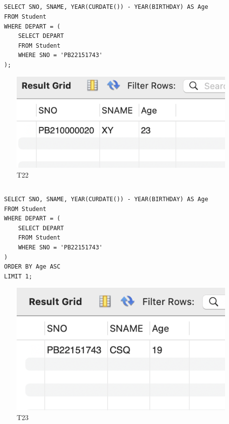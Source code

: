 \documentclass[UTF8]{ctexart}
\begin{document}
\subsection{}
\begin{lstlisting}
  SELECT SNO, SNAME, YEAR(CURDATE()) - YEAR(BIRTHDAY) AS Age
  FROM Student
  WHERE DEPART = (
      SELECT DEPART
      FROM Student
      WHERE SNO = 'PB22151743'
  );
\end{lstlisting}
\begin{figure}[H]
  \centering
  \includegraphics[scale=0.7]{pics/22.png}
  \caption*{T22}
\end{figure}

\subsection{}
\begin{lstlisting}
  SELECT SNO, SNAME, YEAR(CURDATE()) - YEAR(BIRTHDAY) AS Age
  FROM Student
  WHERE DEPART = (
      SELECT DEPART
      FROM Student
      WHERE SNO = 'PB22151743'
  )
  ORDER BY Age ASC
  LIMIT 1;
\end{lstlisting}
\begin{figure}[H]
  \centering
  \includegraphics[scale=0.7]{pics/23.png}
  \caption*{T23}
\end{figure}
\end{document}

